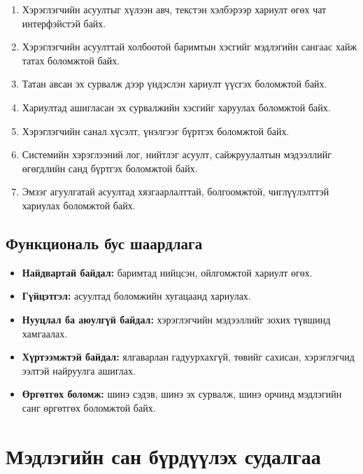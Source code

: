 \begin{enumerate}
    \item Хэрэглэгчийн асуултыг хүлээн авч, текстэн хэлбэрээр хариулт өгөх чат интерфэйстэй байх.
    \item Хэрэглэгчийн асуулттай холбоотой баримтын хэсгийг мэдлэгийн сангаас хайж татах боломжтой байх.
    \item Татан авсан эх сурвалж дээр үндэслэн хариулт үүсгэх боломжтой байх.
    \item Хариултад ашигласан эх сурвалжийн хэсгийг харуулах боломжтой байх.
    \item Хэрэглэгчийн санал хүсэлт, үнэлгээг бүртгэх боломжтой байх.
    \item Системийн хэрэглээний лог, нийтлэг асуулт, сайжруулалтын мэдээллийг өгөгдлийн санд бүртгэх боломжтой байх.
    \item Эмзэг агуулгатай асуултад хязгаарлалттай, болгоомжтой, чиглүүлэлттэй хариулах боломжтой байх.
\end{enumerate}

\subsection{Функциональ бус шаардлага}

\begin{itemize}
    \item \textbf{Найдвартай байдал:} баримтад нийцсэн, ойлгомжтой хариулт өгөх.
    \item \textbf{Гүйцэтгэл:} асуултад боломжийн хугацаанд хариулах.
    \item \textbf{Нууцлал ба аюулгүй байдал:} хэрэглэгчийн мэдээллийг зохих түвшинд хамгаалах.
    \item \textbf{Хүртээмжтэй байдал:} ялгаварлан гадуурхахгүй, төвийг сахисан, хэрэглэгчид ээлтэй найруулга ашиглах.
    \item \textbf{Өргөтгөх боломж:} шинэ сэдэв, шинэ эх сурвалж, шинэ орчинд мэдлэгийн санг өргөтгөх боломжтой байх.
\end{itemize}


\section{Мэдлэгийн сан бүрдүүлэх судалгаа}

